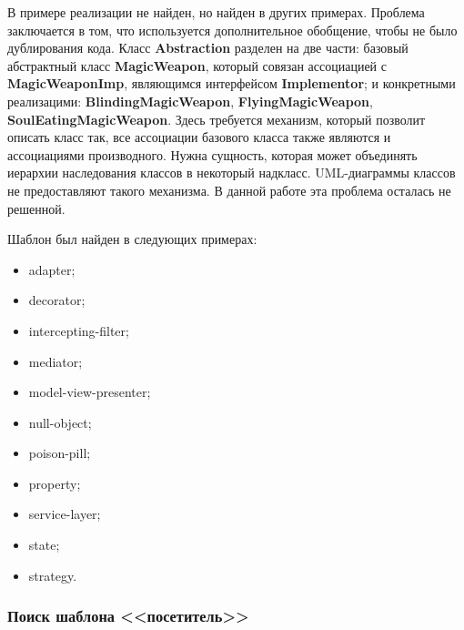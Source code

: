 В примере реализации не найден, но найден в других примерах.
Проблема заключается в том, что используется дополнительное обобщение,
чтобы не было дублирования кода.
Класс \textbf{Abstraction} разделен на две части: базовый абстрактный класс
\textbf{MagicWeapon},
который совязан ассоциацией с \textbf{MagicWeaponImp},
являющимся интерфейсом \textbf{Implementor};
и конкретными реализацими: \textbf{BlindingMagicWeapon},
\textbf{FlyingMagicWeapon}, \textbf{SoulEatingMagicWeapon}.
Здесь требуется механизм, который позволит описать класс так,
все ассоциации базового класса также являются и ассоциациями производного.
Нужна сущность, которая может объединять иерархии наследования классов в
некоторый надкласс.
UML-диаграммы классов не предоставляют такого механизма.
В данной работе эта проблема осталась не решенной.

Шаблон был найден в следующих примерах:
\begin{itemize}
\item adapter;
\item decorator;
\item intercepting-filter;
\item mediator;
\item model-view-presenter;
\item null-object;
\item poison-pill;
\item property;
\item service-layer;
\item state;
\item strategy.
\end{itemize}

\subsubsection{Поиск шаблона <<посетитель>>}
